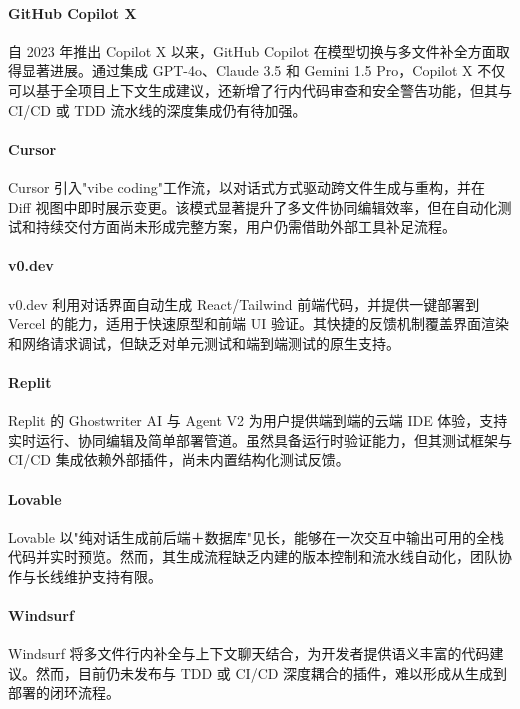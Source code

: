 \paragraph{GitHub Copilot X}  
自 2023 年推出 Copilot X 以来，GitHub Copilot 在模型切换与多文件补全方面取得显著进展。通过集成 GPT-4o、Claude 3.5 和 Gemini 1.5 Pro，Copilot X 不仅可以基于全项目上下文生成建议，还新增了行内代码审查和安全警告功能，但其与 CI/CD 或 TDD 流水线的深度集成仍有待加强\cite{copilotx2023}。

\paragraph{Cursor}  
Cursor 引入"vibe coding"工作流，以对话式方式驱动跨文件生成与重构，并在 Diff 视图中即时展示变更。该模式显著提升了多文件协同编辑效率，但在自动化测试和持续交付方面尚未形成完整方案，用户仍需借助外部工具补足流程\cite{cursor2025wiki}。

\paragraph{v0.dev}  
v0.dev 利用对话界面自动生成 React/Tailwind 前端代码，并提供一键部署到 Vercel 的能力，适用于快速原型和前端 UI 验证。其快捷的反馈机制覆盖界面渲染和网络请求调试，但缺乏对单元测试和端到端测试的原生支持\cite{v0dev2024}。

\paragraph{Replit}  
Replit 的 Ghostwriter AI 与 Agent V2 为用户提供端到端的云端 IDE 体验，支持实时运行、协同编辑及简单部署管道。虽然具备运行时验证能力，但其测试框架与 CI/CD 集成依赖外部插件，尚未内置结构化测试反馈\cite{replit2025wiki}。

\paragraph{Lovable}  
Lovable 以"纯对话生成前后端＋数据库"见长，能够在一次交互中输出可用的全栈代码并实时预览。然而，其生成流程缺乏内建的版本控制和流水线自动化，团队协作与长线维护支持有限\cite{lovable2025times}。

\paragraph{Windsurf}  
Windsurf 将多文件行内补全与上下文聊天结合，为开发者提供语义丰富的代码建议。然而，目前仍未发布与 TDD 或 CI/CD 深度耦合的插件，难以形成从生成到部署的闭环流程\cite{windsurf2024}。

